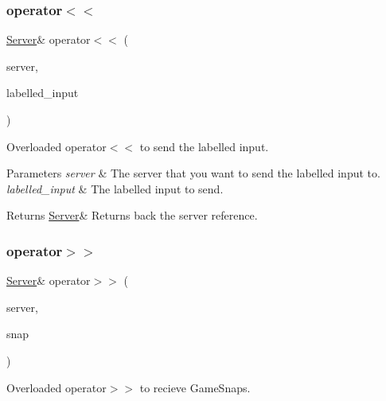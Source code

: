 \subsubsection{\texorpdfstring{operator$<$$<$}{operator<<}}
{\footnotesize\ttfamily \hyperlink{classcp_1_1_server}{Server}\& operator$<$$<$ (\begin{DoxyParamCaption}\item[{\hyperlink{classcp_1_1_server}{Server} \&}]{server,  }\item[{const key\+\_\+input\+\_\+type \&}]{labelled\+\_\+input }\end{DoxyParamCaption})\hspace{0.3cm}{\ttfamily [friend]}}



Overloaded operator$<$$<$ to send the labelled input. 


\begin{DoxyParams}{Parameters}
{\em server} & The server that you want to send the labelled input to. \\
\hline
{\em labelled\+\_\+input} & The labelled input to send. \\
\hline
\end{DoxyParams}
\begin{DoxyReturn}{Returns}
\hyperlink{classcp_1_1_server}{Server}\& Returns back the server reference. 
\end{DoxyReturn}
\mbox{\label{classcp_1_1_server_a0be043cde5346b18f9fed76e2ae909b7}} 
\subsubsection{\texorpdfstring{operator$>$$>$}{operator>>}}
{\footnotesize\ttfamily \hyperlink{classcp_1_1_server}{Server}\& operator$>$$>$ (\begin{DoxyParamCaption}\item[{\hyperlink{classcp_1_1_server}{Server} \&}]{server,  }\item[{\hyperlink{classcp_1_1_game_simulator_snap}{Game\+Simulator\+Snap} \&}]{snap }\end{DoxyParamCaption})\hspace{0.3cm}{\ttfamily [friend]}}



Overloaded operator$>$$>$ to recieve Game\+Snaps. 


